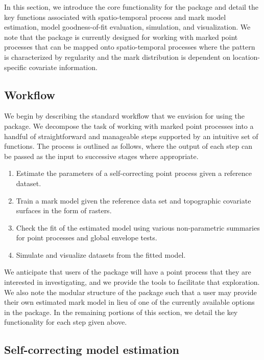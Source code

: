 In this section, we introduce the core functionality for the
 package and detail the key functions associated with
spatio-temporal process and mark model estimation, model goodness-of-fit
evaluation, simulation, and visualization. We note that the package is
currently designed for working with marked point processes that can be
mapped onto spatio-temporal processes where the pattern is characterized
by regularity and the mark distribution is dependent on location-
specific covariate information.

\subsection{Workflow}\label{workflow}

We begin by describing the standard workflow that we envision for using
the package. We decompose the task of working with marked point
processes into a handful of straightforward and manageable steps
supported by an intuitive set of functions. {The process is outlined
as follows, where the output of each step can be passed as the input to successive stages where appropriate.}

\begin{enumerate}
\def\labelenumi{\arabic{enumi}.}
\tightlist
\item
  Estimate the parameters of a self-correcting point process given a
  reference dataset.
\item
  Train a mark model given the reference data set and topographic
  covariate surfaces in the form of rasters.
\item
  Check the fit of the estimated model using various non-parametric
  summaries for point processes and global envelope tests.
\item
  Simulate and visualize datasets from the fitted model.
\end{enumerate}

We anticipate that users of the package will have a point process that
they are interested in investigating, and we provide the tools to
facilitate that exploration. We also note the modular structure of the
package such that a user may provide their own estimated mark model in
lieu of one of the currently available options in the package. In the
remaining portions of this section, we detail the key functionality for
each step given above.

\subsection{Self-correcting model estimation}\label{scestimation}

